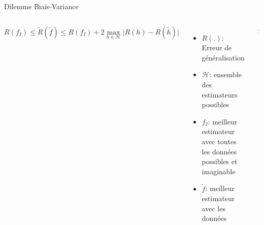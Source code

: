 \documentclass[presentation, aspectratio=169]{beamer}
\begin{document}
\begin{frame}{Dilemme Biais-Variance}
  \begin{columns}
    \begin{equation*}
      R(f_I) \le \tilde R(\tilde f) \le R(f_I)
      + 2\max_{h\in\mathcal H}\lvert R(h) - R(\tilde h)\rvert
    \end{equation*}
    \begin{itemize}
    \item $R(.)$: Erreur de généralisation
    \item $\mathcal H$: ensemble des estimateurs possibles
    \item $f_I$: meilleur estimateur avec toutes les données possibles
      et imaginable
    \item $\tilde f$: meilleur estimateur avec les données
    \end{itemize}
    \includegraphics[width=\textwidth]{biais-variance}
  \end{columns}
\end{frame}
\end{document}
